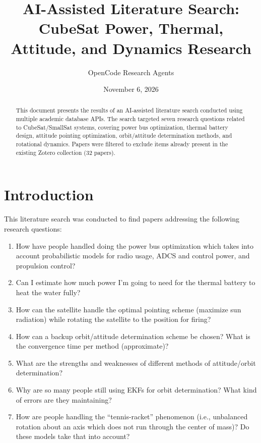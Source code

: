 \documentclass[11pt]{article}
\title{AI-Assisted Literature Search:\\
CubeSat Power, Thermal, Attitude, and Dynamics Research}
\author{OpenCode Research Agents}
\date{November 6, 2026}
\begin{document}
\maketitle

\begin{abstract}
This document presents the results of an AI-assisted literature search conducted using multiple academic database APIs. The search targeted seven research questions related to CubeSat/SmallSat systems, covering power bus optimization, thermal battery design, attitude pointing optimization, orbit/attitude determination methods, and rotational dynamics. Papers were filtered to exclude items already present in the existing Zotero collection (32 papers).
\end{abstract}

\tableofcontents
\newpage

\section{Introduction}
This literature search was conducted to find papers addressing the following research questions:

\begin{enumerate}
    \item How have people handled doing the power bus optimization which takes into account probabilistic models for radio usage, ADCS and control power, and propulsion control?
    \item Can I estimate how much power I'm going to need for the thermal battery to heat the water fully?
    \item How can the satellite handle the optimal pointing scheme (maximize sun radiation) while rotating the satellite to the position for firing?
    \item How can a backup orbit/attitude determination scheme be chosen? What is the convergence time per method (approximate)?
    \item What are the strengths and weaknesses of different methods of attitude/orbit determination?
    \item Why are so many people still using EKFs for orbit determination? What kind of errors are they maintaining?
    \item How are people handling the ``tennis-racket'' phenomenon (i.e., unbalanced rotation about an axis which does not run through the center of mass)? Do these models take that into account?
\end{enumerate}
\end{document}
